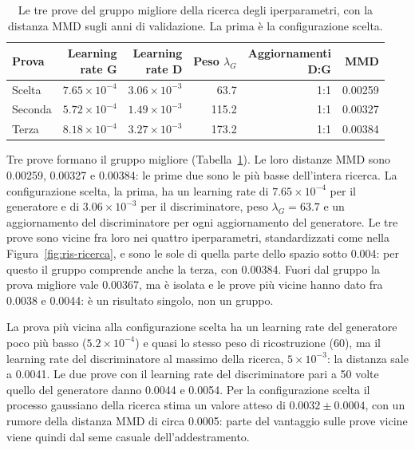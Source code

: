 \begin{table}[htbp]
    \centering
    \footnotesize
    \caption{Le tre prove del gruppo migliore della ricerca degli iperparametri, con la distanza MMD sugli anni di validazione. La prima è la configurazione scelta.}
    \label{tab:ris-regione}
    \vspace{0.6em}
    \begin{tabular}{@{}lrrrrr@{}}
        \toprule
        Prova & \shortstack[r]{Learning\\rate G} & \shortstack[r]{Learning\\rate D} & \shortstack[r]{Peso\\$\lambda_G$} & \shortstack[r]{Aggiornamenti\\D:G} & MMD \\
        \midrule
        Scelta & $7.65\times10^{-4}$ & $3.06\times10^{-3}$ & 63.7 & 1:1 & 0.00259 \\
        Seconda & $5.72\times10^{-4}$ & $1.49\times10^{-3}$ & 115.2 & 1:1 & 0.00327 \\
        Terza & $8.18\times10^{-4}$ & $3.27\times10^{-3}$ & 173.2 & 1:1 & 0.00384 \\
        \bottomrule
    \end{tabular}
\end{table}

Tre prove formano il gruppo migliore (Tabella~\ref{tab:ris-regione}). Le loro distanze MMD sono 0.00259, 0.00327 e 0.00384: le prime due sono le più basse dell'intera ricerca. La configurazione scelta, la prima, ha un learning rate di $7.65\times10^{-4}$ per il generatore e di $3.06\times10^{-3}$ per il discriminatore, peso $\lambda_G=63.7$ e un aggiornamento del discriminatore per ogni aggiornamento del generatore. Le tre prove sono vicine fra loro nei quattro iperparametri, standardizzati come nella Figura~\ref{fig:ris-ricerca}, e sono le sole di quella parte dello spazio sotto 0.004: per questo il gruppo comprende anche la terza, con 0.00384. Fuori dal gruppo la prova migliore vale 0.00367, ma è isolata e le prove più vicine hanno dato fra 0.0038 e 0.0044: è un risultato singolo, non un gruppo.

La prova più vicina alla configurazione scelta ha un learning rate del generatore poco più basso ($5.2\times10^{-4}$) e quasi lo stesso peso di ricostruzione (60), ma il learning rate del discriminatore al massimo della ricerca, $5\times10^{-3}$: la distanza sale a 0.0041. Le due prove con il learning rate del discriminatore pari a 50 volte quello del generatore danno 0.0044 e 0.0054. Per la configurazione scelta il processo gaussiano della ricerca stima un valore atteso di $0.0032\pm0.0004$, con un rumore della distanza MMD di circa 0.0005: parte del vantaggio sulle prove vicine viene quindi dal seme casuale dell'addestramento.

